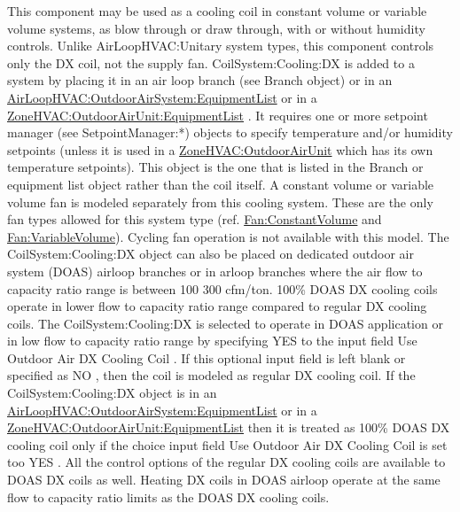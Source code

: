 This component may be used as a cooling coil in constant volume or variable volume systems, as blow through or draw through, with or without humidity controls. Unlike AirLoopHVAC:Unitary system types, this component controls only the DX coil, not the supply fan. CoilSystem:Cooling:DX is added to a system by placing it in an air loop branch (see Branch object) or in an \hyperref[airloophvacoutdoorairsystemequipmentlist]{AirLoopHVAC:OutdoorAirSystem:EquipmentList} or in a \hyperref[zonehvacoutdoorairunitequipmentlist]{ZoneHVAC:OutdoorAirUnit:EquipmentList} . It requires one or more setpoint manager (see SetpointManager:*) objects to specify temperature and/or humidity setpoints (unless it is used in a \hyperref[zonehvacoutdoorairunit]{ZoneHVAC:OutdoorAirUnit} which has its own temperature setpoints). This object is the one that is listed in the Branch or equipment list object rather than the coil itself. A constant volume or variable volume fan is modeled separately from this cooling system. These are the only fan types allowed for this system type (ref. \hyperref[fanconstantvolume]{Fan:ConstantVolume} and \hyperref[fanvariablevolume]{Fan:VariableVolume}). Cycling fan operation is not available with this model. The CoilSystem:Cooling:DX object can also be placed on dedicated outdoor air system (DOAS) airloop branches or in arloop branches where the air flow to capacity ratio range is between 100 300 cfm/ton. 100\% DOAS DX cooling coils operate in lower flow to capacity ratio range compared to regular DX cooling coils. The CoilSystem:Cooling:DX is selected to operate in DOAS application or in low flow to capacity ratio range by specifying YES to the input field Use Outdoor Air DX Cooling Coil . If this optional input field is left blank or specified as NO , then the coil is modeled as regular DX cooling coil. If the CoilSystem:Cooling:DX object is in an \hyperref[airloophvacoutdoorairsystemequipmentlist]{AirLoopHVAC:OutdoorAirSystem:EquipmentList} or in a \hyperref[zonehvacoutdoorairunitequipmentlist]{ZoneHVAC:OutdoorAirUnit:EquipmentList} then it is treated as 100\% DOAS DX cooling coil only if the choice input field Use Outdoor Air DX Cooling Coil is set too YES . All the control options of the regular DX cooling coils are available to DOAS DX coils as well. Heating DX coils in DOAS airloop operate at the same flow to capacity ratio limits as the DOAS DX cooling coils.

